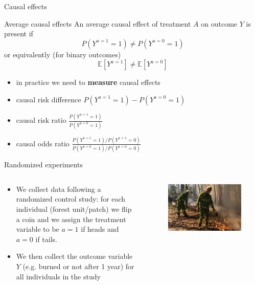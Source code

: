 \documentclass{beamer}
\begin{document}
\begin{frame}{Causal effects}
  \begin{definition}{Average causal effects}
    An average causal effect of treatment $A$ on outcome $Y$ is present if
    \[ P(Y^{a=1} = 1) \neq   P(Y^{a=0} = 1) \]
    or equivalently (for binary outcomes)
    \[ \mathbb{E}[Y^{a=1}] \neq \mathbb{E}[Y^{a=0}] \]
  \end{definition}
  \begin{itemize}
    \item<2-> in practice we need to \textbf{measure} causal effects
    \item<3-> {causal risk difference} $P(Y^{a=1} = 1) - P(Y^{a=0} = 1)$
    \item<4-> {causal risk ratio} $\frac{P(Y^{a=1} = 1)}{P(Y^{a=0} = 1)}$
    \item<5-> {causal odds ratio} $\frac{P(Y^{a=1} = 1) / P(Y^{a=1} = 0) }{P(Y^{a=0} = 1) / P(Y^{a=0} = 0)}$
  \end{itemize}
\end{frame}



\begin{frame}{Randomized experiments}
  \begin{columns}

    \begin{column}{0.5\textwidth}
  \begin{itemize}
    \item<1-> We collect data following a randomized control study:
      for each individual (forest unit/patch)  we flip a coin and we assign the treatment variable
      to be $a=1$ if heads and $a=0$ if tails.
    \item<2-> We then collect the outcome variable $Y$ (e.g. burned or not after 1 year) for all individuals in
      the study
  \end{itemize}
    \end{column}
    \begin{column}{0.5\textwidth}
     \begin{figure}
       \includegraphics[width = \textwidth]{crew}
     \end{figure}
    \end{column}
  \end{columns}
\end{frame}
\end{document}
